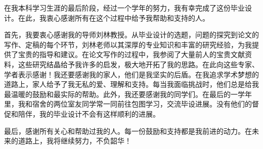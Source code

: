 
\begin{acknowledgements}
在我本科学习生涯的最后阶段，经过一个学年的努力，我有幸完成了这份毕业设计。在此，我衷心感谢所有在这个过程中给予我帮助和支持的人。

首先，我要衷心感谢我的导师刘林教授。从毕业设计的选题，问题的探究到论文的写作、定稿的每个环节，刘林老师以其深厚的专业知识和丰富的研究经验，为我提供了宝贵的指导和建议。在论文写作的过程中，我参阅了大量前人的宝贵文献资料，这些研究结晶给予我许多的启发，极大地开拓了我的思路。在此向这些专家、学者表示感谢！我还要感谢我的家人，他们是我坚实的后盾。在我追求学术梦想的道路上，家人给予了我无私的爱、理解和支持。每当我面临挑战时，他们总是给我最温暖的鼓励和最实际的帮助。此外，我还要感谢我的同学们。在最后的一学年里，我和宿舍的两位室友同学常一同前往包图学习，交流毕设进展。没有他们的督促和陪伴，我的毕业设计不会有这样顺利的进展。

最后，感谢所有关心和帮助过我的人。每一份鼓励和支持都是我前进的动力。在未来的道路上，我将继续努力，不负韶华！
\end{acknowledgements}

